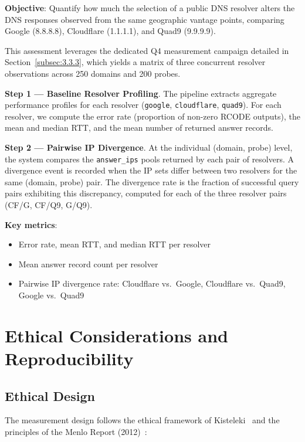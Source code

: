 \textbf{Objective}: Quantify how much the selection of a public \ac{DNS} resolver alters the \ac{DNS} responses observed from the same geographic vantage points, comparing Google (8.8.8.8), Cloudflare (1.1.1.1), and Quad9 (9.9.9.9).

This assessment leverages the dedicated Q4 measurement campaign detailed in Section~\ref{subsec:3.3.3}, which yields a matrix of three concurrent resolver observations across 250 domains and 200 probes.

\textbf{Step 1 — Baseline Resolver Profiling}. The pipeline extracts aggregate performance profiles for each resolver (\texttt{google}, \texttt{cloudflare}, \texttt{quad9}). For each resolver, we compute the error rate (proportion of non-zero RCODE outputs), the mean and median \ac{RTT}, and the mean number of returned answer records.

\textbf{Step 2 — Pairwise \ac{IP} Divergence}. At the individual (domain, probe) level, the system compares the \texttt{answer\_ips} pools returned by each pair of resolvers. A divergence event is recorded when the \ac{IP} sets differ between two resolvers for the same (domain, probe) pair. The divergence rate is the fraction of successful query pairs exhibiting this discrepancy, computed for each of the three resolver pairs (CF/G, CF/Q9, G/Q9).

\textbf{Key metrics}:
\begin{itemize}
  \item Error rate, mean \ac{RTT}, and median \ac{RTT} per resolver
  \item Mean answer record count per resolver
  \item Pairwise \ac{IP} divergence rate: Cloudflare vs.\ Google, Cloudflare vs.\ Quad9, Google vs.\ Quad9
\end{itemize}

\bigskip
\section{Ethical Considerations and Reproducibility}
\label{sec:3.6}

\subsection{Ethical Design}
\label{subsec:3.6.1}

The measurement design follows the ethical framework of Kisteleki~\cite{Kisteleki2016} and the principles of the Menlo Report (2012)~\cite{Bailey2012}:

